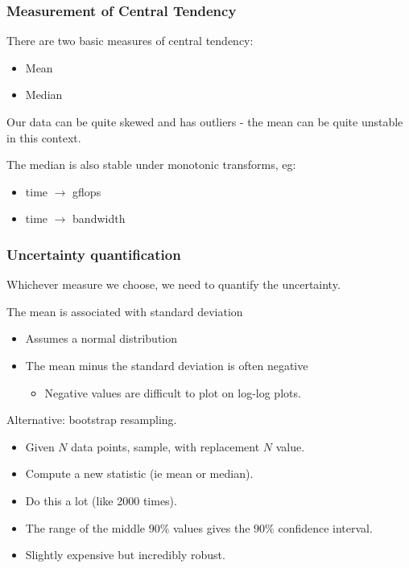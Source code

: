 \documentclass[10pt,aspectratio=169]{beamer}
\begin{document}
\begin{frame}
    \frametitle{Measurement of Central Tendency}


    There are two basic measures of central tendency:

    \begin{itemize}
    \item Mean
    \item Median
    \end{itemize}

    Our data can be quite skewed and has outliers \pause{} - the mean
    can be quite unstable in this context.
   

    \bigskip
    
    \pause{}
    
    The median is also stable under monotonic transforms, eg:
    \begin{itemize}
    \item time $\rightarrow$ gflops
    \item time $\rightarrow$ bandwidth
    \end{itemize}
    
\end{frame}

\begin{frame}
    \frametitle{Uncertainty quantification}

    Whichever measure we choose, we need to quantify the uncertainty.

    \bigskip

    The mean is associated with standard deviation
    \begin{itemize}
    \item Assumes a normal distribution
    \item The mean minus the standard deviation is often negative
      \begin{itemize}
      \item Negative values are difficult to plot on log-log plots.
      \end{itemize}
    \end{itemize}

    \pause
    
    \bigskip
    
    Alternative: bootstrap resampling.
    \begin{itemize}
    \item Given $N$ data points, sample, with replacement $N$ value.
    \item Compute a new statistic (ie mean or median).
    \item Do this a lot (like 2000 times).
    \item The range of the middle $90\%$ values gives the $90\%$
      confidence interval.
    \item Slightly expensive but incredibly robust.
    \end{itemize}
    

\end{frame}
\end{document}
